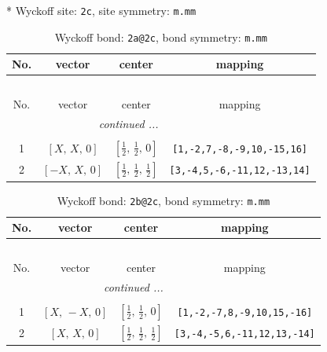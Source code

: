 \documentclass[fleqn,8pt]{jsarticle}
\begin{document}
* Wyckoff site: {\tt 2c}, site symmetry: {\tt m.mm}
\renewcommand{\arraystretch}{1.2}
\begin{longtable}{cccc}
\caption{Wyckoff bond: {\tt 2a@2c}, bond symmetry: {\tt m.mm}}
 \\
 \hline \hline
No. & vector & center & mapping \\ \hline \endfirsthead

\multicolumn{3}{l}{\tablename\ \thetable{}} \\
 \hline \hline
No. & vector & center & mapping \\ \hline \endhead

 \hline \hline
\multicolumn{3}{r}{\footnotesize\it continued ...} \\ \endfoot

 \hline \hline
\multicolumn{3}{r}{} \\ \endlastfoot

1 & $\left[ X,\, X,\, 0 \right]$ & $\left[ \frac{1}{2},\, \frac{1}{2},\, 0 \right]$ & {\tt [1,-2,7,-8,-9,10,-15,16]} \\ \hline
2 & $\left[ - X,\, X,\, 0 \right]$ & $\left[ \frac{1}{2},\, \frac{1}{2},\, \frac{1}{2} \right]$ & {\tt [3,-4,5,-6,-11,12,-13,14]} \\
\end{longtable}
\renewcommand{\arraystretch}{1.2}
\begin{longtable}{cccc}
\caption{Wyckoff bond: {\tt 2b@2c}, bond symmetry: {\tt m.mm}}
 \\
 \hline \hline
No. & vector & center & mapping \\ \hline \endfirsthead

\multicolumn{3}{l}{\tablename\ \thetable{}} \\
 \hline \hline
No. & vector & center & mapping \\ \hline \endhead

 \hline \hline
\multicolumn{3}{r}{\footnotesize\it continued ...} \\ \endfoot

 \hline \hline
\multicolumn{3}{r}{} \\ \endlastfoot

1 & $\left[ X,\, - X,\, 0 \right]$ & $\left[ \frac{1}{2},\, \frac{1}{2},\, 0 \right]$ & {\tt [1,-2,-7,8,-9,10,15,-16]} \\ \hline
2 & $\left[ X,\, X,\, 0 \right]$ & $\left[ \frac{1}{2},\, \frac{1}{2},\, \frac{1}{2} \right]$ & {\tt [3,-4,-5,6,-11,12,13,-14]} \\
\end{longtable}
\end{document}
